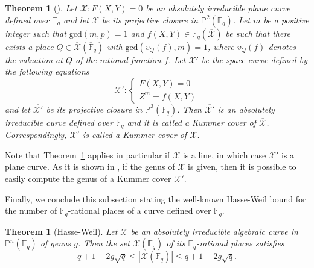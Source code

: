 \documentclass[11pt]{article}
\newtheorem{theorem}[theo]{Theorem}
\theoremstyle{definition}
\numberwithin{equation}{section}
\begin{document}
\begin{theorem}[\textnormal{\cite[Corollary 3.7.4]{Stichtenoth}}]
\label{thm:kummer}
Let $\mathcal{X}: F(X,Y)=0$ be an absolutely irreducible plane curve defined over $\mathbb{F}_q$ and let $\overline{\mathcal{X}}$ be its projective closure in $\mathbb{P}^2(\mathbb{F}_q)$. Let $m$ be a positive integer such that $\mathrm{gcd}(m,p)=1$ and $f(X,Y)\in \mathbb{F}_q(\overline{\mathcal{X}})$ be such that there exists a place $Q\in \overline{\mathcal{X}}(\overline{\mathbb{F}}_q)$ with $\mathrm{gcd}(v_Q(f),m)=1$, where $v_Q(f)$ denotes the valuation at $Q$ of the rational function $f$. 
Let $\mathcal{X}'$ be the space curve defined by the following equations
\begin{equation*}
    \mathcal{X}': \begin{cases}
    F(X,Y) = 0\\
    Z^m = f(X,Y)
    \end{cases}
\end{equation*}
and let $\overline{\mathcal{X}'}$ be its projective closure in $\mathbb{P}^3(\mathbb{F}_q)$.
Then $\overline{\mathcal{X}'}$ is an absolutely irreducible curve defined over $\mathbb{F}_q$ and it is called a \emph{Kummer cover} of $\overline{\mathcal{X}}$. Correspondingly, $\mathcal{X}'$ is called a Kummer cover of $\mathcal{X}$.
\end{theorem} 

Note that  Theorem~\ref{thm:kummer} applies in particular if $\mathcal{X}$ is a line, in which case $\mathcal{X}'$ is a plane curve.
As it is shown in \cite[Corollary 3.7.4]{Stichtenoth}, if the genus of $\mathcal{X}$ is given, then it is possible to easily compute the genus of a Kummer cover $\mathcal{X}'$.

Finally, we conclude this subsection stating the well-known Hasse-Weil bound for the number of $\mathbb{F}_q$-rational places of a curve defined over $\mathbb{F}_q$.

\begin{theorem}[Hasse-Weil]
\label{thm:hasse-weil}
Let $\mathcal{X}$ be an absolutely irreducible algebraic curve in~$\mathbb{P}^n(\mathbb{F}_q)$ of genus $g$. Then the set $\mathcal{X}(\mathbb{F}_q)$ of its $\mathbb{F}_q$-rational places satisfies
\begin{equation}\label{EQ:HW2}
    q + 1 - 2g\sqrt{q} \leq |\mathcal{X}(\mathbb{F}_q)| \leq q + 1 + 2g\sqrt{q}.
\end{equation}
\end{theorem}
\end{document}
